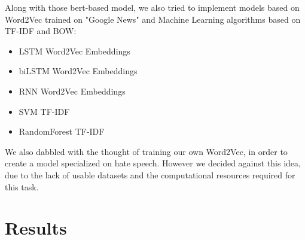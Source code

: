 \documentclass[11pt]{article}
\begin{document}
\begin{enumerate}
	      Along with those bert-based model, we also tried to implement models based on Word2Vec\cite{goldberg2014word2vec}
	      trained on "Google News" and Machine Learning algorithms based on TF-IDF and BOW:

	      \begin{itemize}
		      \item LSTM Word2Vec Embeddings \cite{staudemeyer2019understanding}
		      \item biLSTM Word2Vec Embeddings \cite{huang2015bidirectional}
		      \item RNN Word2Vec Embeddings \cite{rnn}
		      \item SVM TF-IDF
		      \item RandomForest TF-IDF
	      \end{itemize}



	      We also dabbled with the thought of training our own Word2Vec, in
	      order to create a model specialized on hate speech. However we
	      decided against this idea, due to the lack of usable datasets and the
	      computational resources required for this task.


\end{enumerate}


\section{Results}
\end{document}
